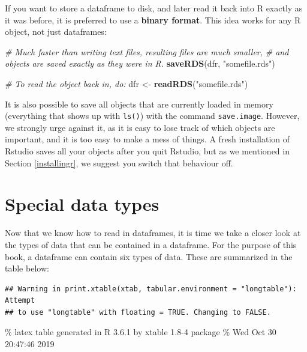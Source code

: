 \documentclass[]{book}
\newenvironment{Shaded}{\begin{snugshade}}{\end{snugshade}}
\newcommand{\CommentTok}[1]{\textcolor[rgb]{0.56,0.35,0.01}{\textit{#1}}}
\newcommand{\KeywordTok}[1]{\textcolor[rgb]{0.13,0.29,0.53}{\textbf{#1}}}
\newcommand{\NormalTok}[1]{#1}
\newcommand{\StringTok}[1]{\textcolor[rgb]{0.31,0.60,0.02}{#1}}
\begin{document}
If you want to store a dataframe to disk, and later read it back into R exactly as it was before, it is preferred to use a \textbf{binary format}. This idea works for any R object, not just dataframes:

\begin{Shaded}
\begin{Highlighting}[]
\CommentTok{# Much faster than writing text files, resulting files are much smaller,}
\CommentTok{# and objects are saved exactly as they were in R.}
\KeywordTok{saveRDS}\NormalTok{(dfr, }\StringTok{"somefile.rds"}\NormalTok{)}

\CommentTok{# To read the object back in, do:}
\NormalTok{dfr <-}\StringTok{ }\KeywordTok{readRDS}\NormalTok{(}\StringTok{"somefile.rds"}\NormalTok{)}
\end{Highlighting}
\end{Shaded}

It is also possible to save all objects that are currently loaded in memory (everything that shows up with \texttt{ls()}) with the command \texttt{save.image}. However, we strongly urge against it, as it is easy to lose track of which objects are important, and it is too easy to make a mess of things. A fresh installation of Rstudio saves all your objects after you quit Rstudio, but as we mentioned in Section \ref{installingr}, we suggest you switch that behaviour off.

\hypertarget{special-data-types}{%
\section{Special data types}\label{special-data-types}}

Now that we know how to read in dataframes, it is time we take a closer look at the types of data that can be contained in a dataframe. For the purpose of this book, a dataframe can contain six types of data. These are summarized in the table below:

\begin{verbatim}
## Warning in print.xtable(xtab, tabular.environment = "longtable"): Attempt
## to use "longtable" with floating = TRUE. Changing to FALSE.
\end{verbatim}

\% latex table generated in R 3.6.1 by xtable 1.8-4 package
\% Wed Oct 30 20:47:46 2019
\end{document}
